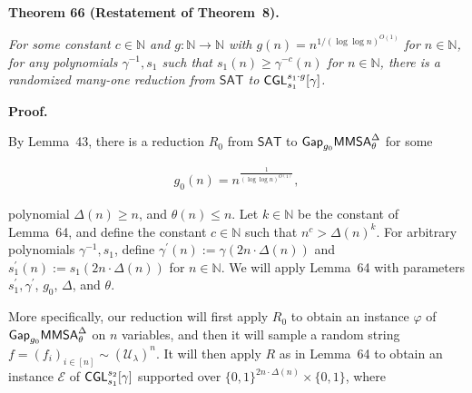 \documentclass[10pt,a4paper]{article}
\begin{document}


\par\medskip\noindent\textbf{
\textbf{Theorem 66}\textbf{ }(Restatement of Theorem 8)\textbf{.}
}\par



\emph{For some constant $c\in\mathbb{N}$ and $g:\mathbb{N}\to\mathbb{N}$ with $g(n)=n^{1/(\log\log n)^{O(1)}}$ for $n\in\mathbb{N}$, for any polynomials $\gamma^{-1},s_{1}$ such that $s_{1}(n)\geq\gamma^{-c}(n)$ for $n\in\mathbb{N}$, there is a randomized many-one reduction from ${\mathsf{SAT}}$ to ${\sf CGL}_{s_{1}}^{s_{1}\cdot g}[\gamma]$.}\par







\par\medskip\noindent\textbf{Proof.}\par




By Lemma 43, there is a reduction $R_{0}$ from ${\mathsf{SAT}}$ to ${\sf Gap}_{g_{0}}{\mathsf{MMSA}}_{\theta}^{\Delta}$ for some\par


\[\begin{gathered}
g_{0}(n)=n^{\frac{1}{(\log\log n)^{O(1)}}},
\end{gathered}\]


polynomial $\Delta(n)\geq n$, and $\theta(n)\leq n$. Let $k\in\mathbb{N}$ be the constant of Lemma 64, and define the constant $c\in\mathbb{N}$ such that $n^{c}>\Delta(n)^{k}$. For arbitrary polynomials $\gamma^{-1},s_{1}$, define $\gamma^{\prime}(n):=\gamma(2n\cdot\Delta(n))$ and $s_{1}^{\prime}(n):=s_{1}(2n\cdot\Delta(n))$ for $n\in\mathbb{N}$. We will apply Lemma 64 with parameters $s_{1}^{\prime},\gamma^{\prime}$, $g_{0}$, $\Delta$, and $\theta$.\par




More specifically, our reduction will first apply $R_{0}$ to obtain an instance $\varphi$ of ${\sf Gap}_{g_{0}}{\mathsf{MMSA}}_{\theta}^{\Delta}$ on $n$ variables, and then it will sample a random string $f=(f_{i})_{i\in[n]}\sim(\mathcal{U}_{\lambda})^{n}$. It will then apply $R$ as in Lemma 64 to obtain an instance $\mathcal{E}$ of ${\sf CGL}_{s_{1}}^{s_{2}}[\gamma]$ supported over $\{0,1\}^{2n\cdot\Delta(n)}\times\{0,1\}$, where\par
\end{document}
